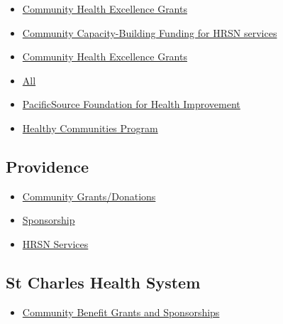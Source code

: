 \documentclass[
  letterpaper,
  DIV=11,
  numbers=noendperiod]{scrreprt}
\providecommand{\tightlist}{%
  \setlength{\itemsep}{0pt}\setlength{\parskip}{0pt}}\usepackage{longtable,booktabs,array}
\begin{document}
\begin{itemize}
\tightlist
\item
  \href{https://pacificsource.com/sites/default/files/2023-02/PRV510_0123_CHE\%20Flier.pdf}{Community
  Health Excellence Grants}
\item
  \href{https://pacificsource.com/article/community-capacity-building-funding-hrsn-services}{Community
  Capacity-Building Funding for HRSN services}
\item
  \href{https://www.ruralhealthinfo.org/funding/5469}{Community Health
  Excellence Grants}
\item
  \href{https://pacificsource.com/sites/default/files/2023-08/CLB1330_0823_PacificSource\%20Funding\%20Navigation\%20Guide.pdf}{All}
\item
  \href{https://pacificsource.com/community/foundation?utm_source=pdf&utm_medium=flier&utm_campaign=FundingGuide&utm_id=CLB1330}{PacificSource
  Foundation for Health Improvement}
\item
  \href{http://www.grantinterface.com/Home/Logon}{Healthy Communities
  Program}
\end{itemize}

\subsection{Providence}\label{providence}

\begin{itemize}
\tightlist
\item
  \href{https://www.providence.org/locations/wa/providence-regional-medical-center-everett/donate-and-volunteer/community-sponsorships}{Community
  Grants/Donations}
\item
  \href{https://webportalapp.com/sp/login/prmce-sponsor-application}{Sponsorship}
\item
  \href{HRSNBenefit@Providence.org}{HRSN Services}
\end{itemize}

\subsection{St Charles Health System}\label{st-charles-health-system}

\begin{itemize}
\tightlist
\item
  \href{https://www.stcharleshealthcare.org/community-health/community-benefit-grants-and-sponsorships}{Community
  Benefit Grants and Sponsorships}
\end{itemize}
\end{document}
